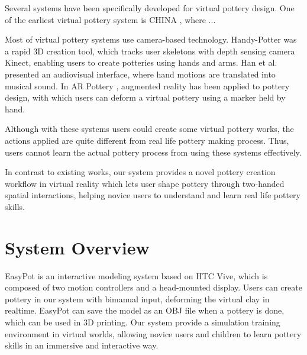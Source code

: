 \documentclass{svjour3}                     %
\begin{document}
Several systems have been specifically developed for virtual pottery design.
One of the earliest virtual pottery system is CHINA \cite{korida1997interactive}, where ...

Most of virtual pottery systems use camera-based technology.
\cite{ramani2014zpots,ramani2015gesture,ramani2016extracting}
Handy-Potter \cite{murugappan2013handy} was a rapid 3D creation tool, which tracks user skeletons with depth sensing camera Kinect, enabling users to create potteries using hands and arms.
Han et al. \cite{han2014virtual} presented an audiovisual interface, where hand motions are translated into musical sound.
In AR Pottery \cite{han2007ar}, augmented reality has been applied to pottery design, with which users can deform a virtual pottery using a marker held by hand.

Although with these systems users could create some virtual pottery works, the actions applied are quite different from real life pottery making process. Thus, users cannot learn the actual pottery process from using these systems effectively.

In contrast to existing works, our system provides a novel pottery creation workflow in virtual reality which lets user shape pottery through two-handed spatial interactions, helping novice users to understand and learn real life pottery skills.




\section{System Overview}
\label{sec:3}
EasyPot is an interactive modeling system based on HTC Vive, which is composed of two motion controllers and a head-mounted display. 
Users can create pottery in our system with bimanual input, deforming the virtual clay in realtime.
EasyPot can save the model as an OBJ file when a pottery is done, which can be used in 3D printing.
Our system provide a simulation training environment in virtual worlds, allowing novice users and children to learn pottery skills in an immersive and interactive way.
\end{document}
